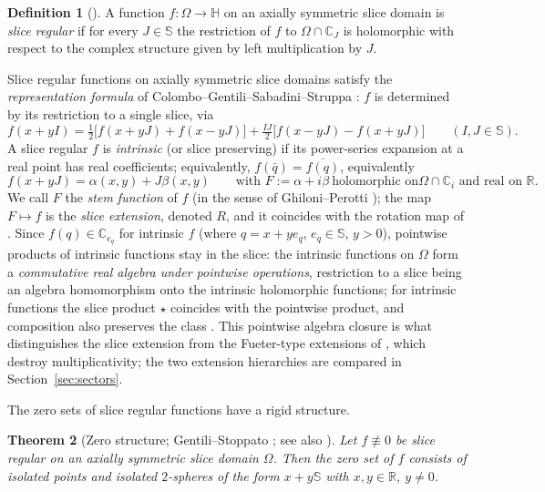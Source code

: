 \documentclass[11pt]{amsart}
\theoremstyle{plain}
\newtheorem{theorem}{Theorem}[section]
\theoremstyle{definition}
\newtheorem{definition}[theorem]{Definition}
\theoremstyle{remark}
\newcommand{\HH}{\mathbb{H}}
\newcommand{\CC}{\mathbb{C}}
\newcommand{\RR}{\mathbb{R}}
\renewcommand{\SS}{\mathbb{S}}
\begin{document}
\begin{definition}[\cite{GentiliStruppa2007}]
A function $f\colon\Omega\to\HH$ on an axially symmetric slice domain is \emph{slice regular} if for
every $J\in\SS$ the restriction of $f$ to $\Omega\cap\CC_J$ is holomorphic with respect to the
complex structure given by left multiplication by $J$.
\end{definition}

Slice regular functions on axially symmetric slice domains satisfy the \emph{representation
formula} of Colombo--Gentili--Sabadini--Struppa \cite{CGSS2009}: $f$ is determined by its
restriction to a single slice, via
\begin{equation}\label{eq:repformula}
f(x+yI)=\tfrac12\bigl[f(x+yJ)+f(x-yJ)\bigr]+\tfrac{IJ}{2}\bigl[f(x-yJ)-f(x+yJ)\bigr]
\qquad(I,J\in\SS).
\end{equation}
A slice regular $f$ is \emph{intrinsic} (or slice preserving) if its power-series expansion at a
real point has real coefficients; equivalently, $f(\bar q)=\overline{f(q)}$, equivalently
\begin{equation}\label{eq:intrinsic}
f(x+yJ)=\alpha(x,y)+J\beta(x,y)\qquad\text{with }F:=\alpha+i\beta\ \text{holomorphic on
}\Omega\cap\CC_i \text{ and real on }\RR.
\end{equation}
We call $F$ the \emph{stem function} of $f$ (in the sense of Ghiloni--Perotti
\cite{GhiloniPerotti2011}); the map $F\mapsto f$ is the \emph{slice extension}, denoted $R$, and it
coincides with the rotation map of \cite[eq.~(2.5)]{Baker2015}. Since $f(q)\in\CC_{e_q}$ for
intrinsic $f$ (where $q=x+ye_q$, $e_q\in\SS$, $y>0$), pointwise products of intrinsic functions stay
in the slice: the intrinsic functions on $\Omega$ form a \emph{commutative real algebra under
pointwise operations}, restriction to a slice being an algebra homomorphism onto the intrinsic
holomorphic functions; for intrinsic functions the slice product $\star$ coincides with the
pointwise product, and composition also preserves the class \cite{GSSbook}. This pointwise algebra
closure is what distinguishes the slice extension from the Fueter-type extensions of
\cite{Baker2015}, which destroy multiplicativity; the two extension hierarchies are compared in
Section~\ref{sec:sectors}.

The zero sets of slice regular functions have a rigid structure.

\begin{theorem}[Zero structure; Gentili--Stoppato \cite{GentiliStoppato2008}; see also
{\cite[Ch.~3]{GSSbook}}]\label{thm:zerostructure}
Let $f\not\equiv0$ be slice regular on an axially symmetric slice domain $\Omega$. Then the zero
set of $f$ consists of isolated points and isolated $2$-spheres of the form $x+y\SS$ with
$x,y\in\RR$, $y\neq0$.
\end{theorem}
\end{document}
